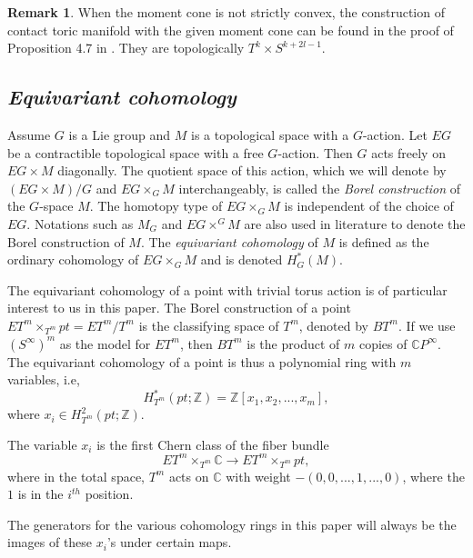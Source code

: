 \documentclass[12pt]{amsart}
\theoremstyle{definition}
\newtheorem{remark}[theorem]{Remark}
\numberwithin{equation}{section}
\begin{document}
\begin{remark}
When the moment cone is not strictly convex, the construction of
contact toric manifold with the given moment cone can be found in
the proof of Proposition 4.7 in \cite{LS:integrable torus actions}.
They are topologically $T^k\times S^{k+2l-1}$.
\end{remark}

\subsection {\it Equivariant cohomology}

Assume $G$ is a Lie group and $M$ is a topological space with a
$G$-action. Let $EG$ be a contractible topological space with a free
$G$-action. Then $G$ acts freely on $EG\times M$ diagonally. The
quotient space of this action, which we will denote by $(EG\times
M)/G$ and $EG\times_{G}M$ interchangeably, is called the {\em Borel
construction} of the $G$-space $M$. The homotopy type of
$EG\times_{G}M$ is independent of the choice of $EG$. Notations such
as $M_{G}$ and $EG\times^{G}M$ are also used in literature to denote
the Borel construction of $M$. The {\em equivariant cohomology} of
$M$ is defined as the ordinary cohomology of $EG\times_{G}M$ and is
denoted $H_{G}^{*}(M)$.

The equivariant cohomology of a point with trivial torus action is
of particular interest to us in this paper. The Borel construction
of a point $ET^m\times_{T^m}pt =ET^m/T^m$ is the classifying space
of $T^m$, denoted by $BT^m$. If we use $(S^{\infty})^{m}$ as the
model for $ET^m$, then $BT^m$ is the product of $m$ copies of ${{\mathbb{C}}}
P^{\infty}$. The equivariant cohomology of a point is thus a
polynomial ring with $m$ variables, i.e,
\begin{equation}
H_{T^m}^{*}(pt;{{\mathbb{Z}}}) = {{\mathbb{Z}}}[x_{1},x_{2},...,x_{m}],
\end{equation}
where $x_{i}\in H^{2}_{T^m}(pt;{{\mathbb{Z}}})$.

 The variable $x_{i}$ is the first Chern class of the fiber bundle
\begin{equation}
ET^m\times_{T^m}{{\mathbb{C}}}\rightarrow ET^m\times_{T^m}pt,
\end{equation}
where in the total space, $T^m$ acts on ${{\mathbb{C}}}$ with weight
$-(0,0,...,1,...,0)$, where the $1$ is in the $i^{th}$ position.

The generators for the various cohomology rings in this paper will
always be the images of these $x_{i}$'s under certain maps.
\end{document}
